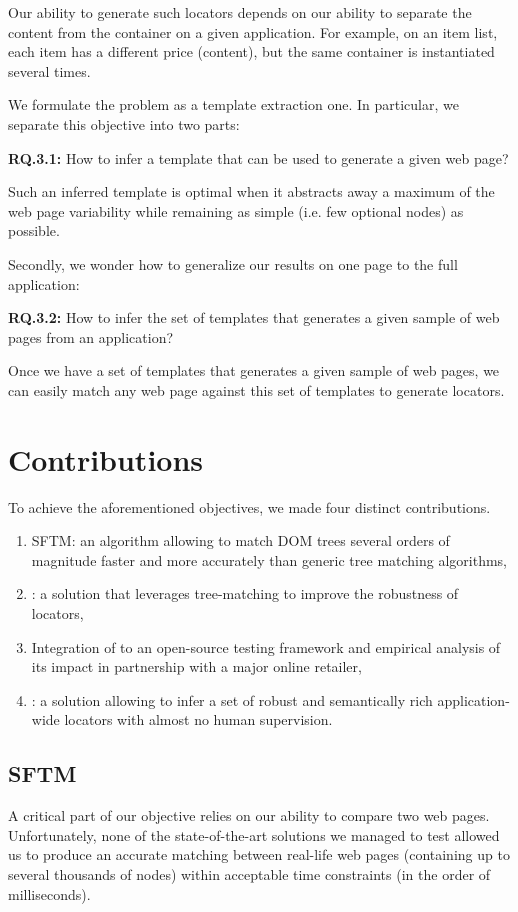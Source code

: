 Our ability to generate such locators depends on our ability to separate the content from the container on a given application. For example, on an item list, each item has a different price (content), but the same container is instantiated several times.

We formulate the problem as a template extraction one.
In particular, we separate this objective into two parts:

\textbf{RQ.3.1:} How to infer a template that can be used to generate a given web page?

Such an inferred template is optimal when it abstracts away a maximum of the web page variability while remaining as simple (i.e. few optional nodes) as possible. 

Secondly, we wonder how to generalize our results on one page to the full application:

\textbf{RQ.3.2:} How to infer the set of templates that generates a given sample of web pages from an application?

Once we have a set of templates that generates a given sample of web pages, we can easily match any web page against this set of templates to generate locators.

\section{Contributions}
To achieve the aforementioned objectives, we made four distinct contributions.

\begin{enumerate}
\item SFTM: an algorithm allowing to match DOM trees several orders of magnitude faster and more accurately than generic tree matching algorithms,
\item \erratum{}: a solution that leverages tree-matching to improve the robustness of locators,
\item Integration of \erratum{} to an open-source testing framework and empirical analysis of its impact in partnership with a major online retailer,
\item \appstract{}: a solution allowing to infer a set of robust and semantically rich application-wide locators with almost no human supervision.
\end{enumerate}

\subsection{SFTM}
A critical part of our objective relies on our ability to compare two web pages.
Unfortunately, none of the state-of-the-art solutions we managed to test allowed us to produce an accurate matching between real-life web pages (containing up to several thousands of nodes) within acceptable time constraints (in the order of milliseconds).

